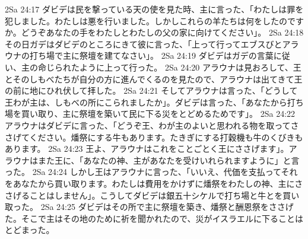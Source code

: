 2Sa 24:17  ダビデは民を撃っている天の使を見た時、主に言った、「わたしは罪を犯しました。わたしは悪を行いました。しかしこれらの羊たちは何をしたのですか。どうぞあなたの手をわたしとわたしの父の家に向けてください」。
2Sa 24:18  その日ガデはダビデのところにきて彼に言った、「上って行ってエブスびとアラウナの打ち場で主に祭壇を建てなさい」。
2Sa 24:19  ダビデはガデの言葉に従い、主の命じられたように上って行った。
2Sa 24:20  アラウナは見おろして、王とそのしもべたちが自分の方に進んでくるのを見たので、アラウナは出てきて王の前に地にひれ伏して拝した。
2Sa 24:21  そしてアラウナは言った、「どうして王わが主は、しもべの所にこられましたか」。ダビデは言った、「あなたから打ち場を買い取り、主に祭壇を築いて民に下る災をとどめるためです」。
2Sa 24:22  アラウナはダビデに言った、「どうぞ王、わが主のよいと思われる物を取ってささげてください。燔祭にする牛もあります。たきぎにする打穀機も牛のくびきもあります。
2Sa 24:23  王よ、アラウナはこれをことごとく王にささげます」。アラウナはまた王に、「あなたの神、主があなたを受けいれられますように」と言った。
2Sa 24:24  しかし王はアラウナに言った、「いいえ、代価を支払ってそれをあなたから買い取ります。わたしは費用をかけずに燔祭をわたしの神、主にささげることはしません」。こうしてダビデは銀五十シケルで打ち場と牛とを買い取った。
2Sa 24:25  ダビデはその所で主に祭壇を築き、燔祭と酬恩祭をささげた。そこで主はその地のために祈を聞かれたので、災がイスラエルに下ることはとどまった。


